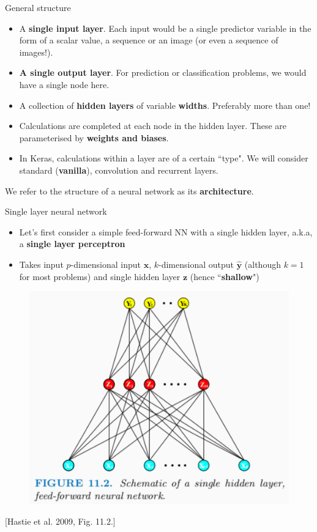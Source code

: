 \documentclass{beamer}
\begin{document}
\begin{frame}{General structure}
\begin{itemize}
\item A \textbf{single input layer}. Each input would be a single predictor variable in the form of a scalar value, a sequence or an image (or even a sequence of images!).
\item \textbf{A single output layer}. For prediction or classification problems, we would have a single node here. 
\item A collection of \textbf{hidden layers} of variable \textbf{widths}. Preferably more than one!
\item Calculations are completed at each node in the hidden layer. These are parameterised by \textbf{weights and biases}.
\item In Keras, calculations within a layer are of a certain ``type". We will consider standard (\textbf{vanilla}), convolution and recurrent layers.
\end{itemize}
We refer to the structure of a neural network as its \textbf{architecture}.
\end{frame}
\begin{frame}{Single layer neural network}
\begin{itemize}
\item Let's first consider a simple feed-forward NN with a single hidden layer, a.k.a, a \textbf{single layer perceptron}
\item Takes input $p$-dimensional input $\mathbf{x}$, $k$-dimensional output $\hat{\mathbf{y}}$ (although $k=1$ for most problems) and single hidden layer $\mathbf{z}$ (hence ``\textbf{shallow}")
\end{itemize}
\begin{figure}
\includegraphics[width=0.48\linewidth]{Images/singleNN.png}
\end{figure}
[Hastie et al. 2009, Fig. 11.2.]
\end{frame}
\end{document}
